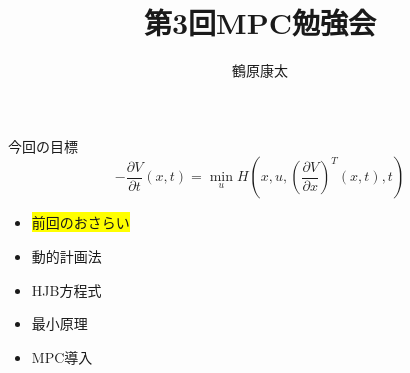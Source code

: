 \documentclass[dvipdfmx,12pt]{beamer}
\title{第3回MPC勉強会}
\author{鶴原康太}
\begin{document}
    \frame{\maketitle}
    
    \begin{frame}{今回の目標}
        \footnotesize
        \begin{equation*}
            -\frac{\partial V}{\partial t}\left(x,t\right) = \min _u H\left(x, u, \left( \frac{\partial V}{\partial x} \right)^T\left(x, t\right), t \right)
        \end{equation*}
        \centering
        \begin{itemize}
            \item \colorbox{yellow}{前回のおさらい}
            \item 動的計画法
            \item HJB方程式
            \item 最小原理
            \item MPC導入
        \end{itemize}
    \end{frame}

    
\end{document}
